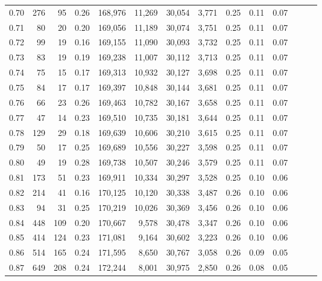 \begin{tabular}{rrrrrrrrrrrrrr}
0.70 &     276 &     95 &  0.26 &  168,976 &   11,269 &  30,054 &   3,771 &  0.25 &  0.11 &      0.07 \\
0.71 &      80 &     20 &  0.20 &  169,056 &   11,189 &  30,074 &   3,751 &  0.25 &  0.11 &      0.07 \\
0.72 &      99 &     19 &  0.16 &  169,155 &   11,090 &  30,093 &   3,732 &  0.25 &  0.11 &      0.07 \\
0.73 &      83 &     19 &  0.19 &  169,238 &   11,007 &  30,112 &   3,713 &  0.25 &  0.11 &      0.07 \\
0.74 &      75 &     15 &  0.17 &  169,313 &   10,932 &  30,127 &   3,698 &  0.25 &  0.11 &      0.07 \\
0.75 &      84 &     17 &  0.17 &  169,397 &   10,848 &  30,144 &   3,681 &  0.25 &  0.11 &      0.07 \\
0.76 &      66 &     23 &  0.26 &  169,463 &   10,782 &  30,167 &   3,658 &  0.25 &  0.11 &      0.07 \\
0.77 &      47 &     14 &  0.23 &  169,510 &   10,735 &  30,181 &   3,644 &  0.25 &  0.11 &      0.07 \\
0.78 &     129 &     29 &  0.18 &  169,639 &   10,606 &  30,210 &   3,615 &  0.25 &  0.11 &      0.07 \\
0.79 &      50 &     17 &  0.25 &  169,689 &   10,556 &  30,227 &   3,598 &  0.25 &  0.11 &      0.07 \\
0.80 &      49 &     19 &  0.28 &  169,738 &   10,507 &  30,246 &   3,579 &  0.25 &  0.11 &      0.07 \\
0.81 &     173 &     51 &  0.23 &  169,911 &   10,334 &  30,297 &   3,528 &  0.25 &  0.10 &      0.06 \\
0.82 &     214 &     41 &  0.16 &  170,125 &   10,120 &  30,338 &   3,487 &  0.26 &  0.10 &      0.06 \\
0.83 &      94 &     31 &  0.25 &  170,219 &   10,026 &  30,369 &   3,456 &  0.26 &  0.10 &      0.06 \\
0.84 &     448 &    109 &  0.20 &  170,667 &    9,578 &  30,478 &   3,347 &  0.26 &  0.10 &      0.06 \\
0.85 &     414 &    124 &  0.23 &  171,081 &    9,164 &  30,602 &   3,223 &  0.26 &  0.10 &      0.06 \\
0.86 &     514 &    165 &  0.24 &  171,595 &    8,650 &  30,767 &   3,058 &  0.26 &  0.09 &      0.05 \\
0.87 &     649 &    208 &  0.24 &  172,244 &    8,001 &  30,975 &   2,850 &  0.26 &  0.08 &      0.05 \\

\end{tabular}
